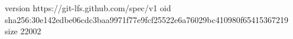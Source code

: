 version https://git-lfs.github.com/spec/v1
oid sha256:30e142edbe06cdc3baa9971f77e9fcf25522e6a76029bc410980f65415367219
size 22002
